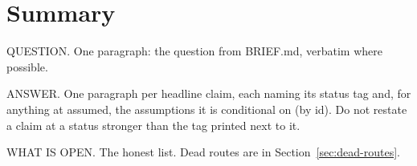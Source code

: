 \section{Summary}\label{sec:summary}

QUESTION. One paragraph: the question from BRIEF.md, verbatim where possible.

ANSWER. One paragraph per headline claim, each naming its status tag and, for anything at
\textsf{assumed}, the assumptions it is conditional on (by id). Do not restate a claim at a
status stronger than the tag printed next to it.

WHAT IS OPEN. The honest list. Dead routes are in Section~\ref{sec:dead-routes}.

